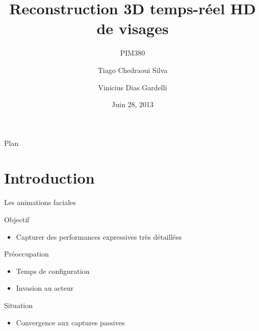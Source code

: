 \documentclass[compress,pdf,11pt,xcolor=dvipsnames]{beamer}
\title{Reconstruction 3D temps-réel HD de visages}
\subtitle{PIM380}
\author[Tiago Siva, Vinicius Gardelli]{
  Tiago Chedraoui Silva \and
  Vinicius Dias Gardelli\\
}
\institute{Télécom Paristech}
\date{Juin 28, 2013}
\begin{document}
\begin{frame}
  \titlepage
\end{frame}

\begin{frame}{Plan}
  \tableofcontents
\end{frame}

\section{Introduction}

\begin{frame}{Les animations faciales}

        \begin{block}{Objectif}
          \begin{itemize}
          \item Capturer des performances expressives très
          détaillées
          \end{itemize}
        \end{block}

        \begin{alertblock}{Préoccupation}
          \begin{itemize}
          \item Temps de configuration 
          \item Invasion au acteur 
          \end{itemize}
        \end{alertblock}

        \begin{exampleblock}{Situation}
          \begin{itemize}
          \item Convergence aux captures passives
          \end{itemize}
        \end{exampleblock}


      

\end{frame}
\end{document}
